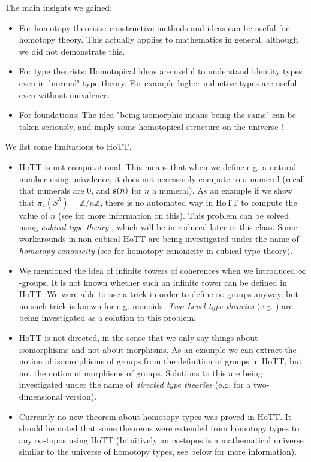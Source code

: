 \documentclass{article}
\newcommand{\s}{\mathrm{\bf s}}
\begin{document}
\noindent The main insights we gained:
\begin{itemize}
\item For homotopy theorists: constructive methods and ideas can be useful for homotopy theory. This actually applies to mathematics in general, although we did not demonstrate this.
\item For type theorists: Homotopical ideas are useful to understand identity types even in "normal" type theory. For example higher inductive types are useful even without univalence. 
\item For foundations: The idea "being isomorphic means being the same" can be taken seriously, and imply some homotopical structure on the universe !
\end{itemize}

\noindent We list some limitations to HoTT. %
\begin{itemize}
\item HoTT is not computational. This means that when we define e.g. a natural number using univalence, it does not necessarily compute to a numeral (recall that numerals are $0$, and $\s(n)$ for $n$ a numeral). As an example if we show that $\pi_4(S^3) = \mathbb{Z}/n\mathbb{Z}$, there is no automated way in HoTT to compute the value of $n$ (see \cite{brunerie2016groupes} for more information on this). This problem can be solved using \emph{cubical type theory} \cite{cohen2016cubical}, which will be introduced later in this class. Some workarounds in non-cubical HoTT are being investigated under the name of \emph{homotopy canonicity} (see \cite{coquand2019homotopy} for homotopy canonicity in cubical type theory).
\item We mentioned the idea of infinite towers of coherences when we introduced $\infty$-groups. It is not known whether such an infinite tower can be defined in HoTT. We were able to use a trick in order to define $\infty$-groups anyway, but no such trick is known for e.g. monoids. \emph{Two-Level type theories} (e.g. \cite{annenkov2017two}) are being investigated as a solution to this problem.
\item HoTT is not directed, in the sense that we only say things about isomorphisms and not about morphisms. As an example we can extract the notion of isomorphisms of groups from the definition of groups in HoTT, but not the notion of morphisms of groups. Solutions to this are being investigated under the name of \emph{directed type theories} (e.g. \cite{licata2012} for a two-dimensional version).
\item Currently no new theorem about homotopy types was proved in HoTT. It should be noted that some theorems were extended from homotopy types to any $\infty$-topos using HoTT (Intuitively an $\infty$-topos is a mathematical universe similar to the universe of homotopy types, see below for more information).
\end{itemize}
\end{document}
